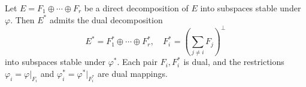 Let $E = F_1 \oplus \cdots \oplus F_r$ be a direct decomposition of $E$ into subspaces stable under $\varphi$. Then $E^*$ admits the dual decomposition
$$E^* = F_1^* \oplus \cdots \oplus F_r^*, \quad F_i^* = \left( \sum_{j \neq i} F_j \right)^\perp$$
into subspaces stable under $\varphi^*$. Each pair $F_i, F_i^*$ is dual, and the restrictions $\varphi_i = \varphi|_{F_i}$ and $\varphi_i^* = \varphi^*|_{F_i^*}$ are dual mappings.
